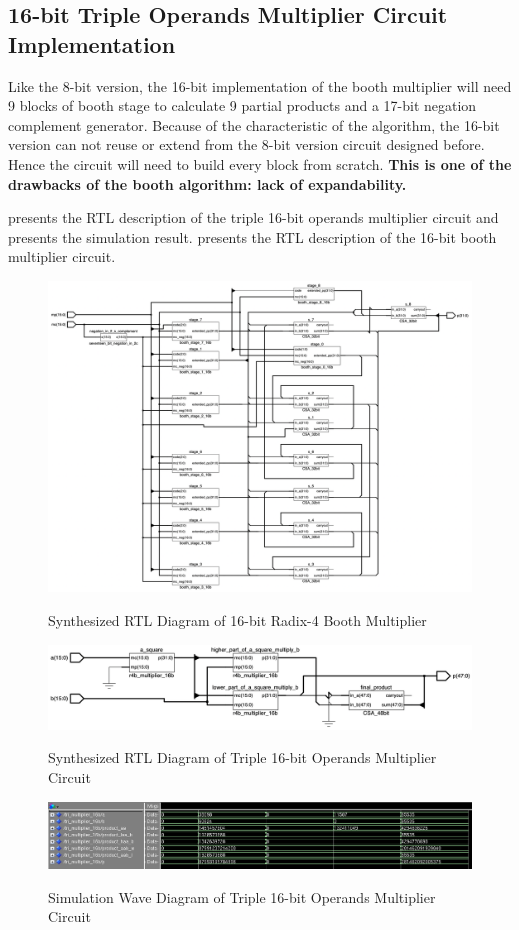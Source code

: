 \newpage
\subsection{16-bit Triple Operands Multiplier Circuit Implementation}

Like the 8-bit version, the 16-bit implementation of the booth multiplier will need 9 blocks of booth stage to calculate 9 partial products
and a 17-bit negation complement generator.
Because of the characteristic of the algorithm, the 16-bit version can not reuse or extend from the 8-bit version circuit designed before.
Hence the circuit will need to build every block from scratch.
\textbf{This is one of the drawbacks of the booth algorithm: lack of expandability.}

 presents the RTL description of the triple 16-bit operands multiplier circuit
and  presents the simulation result.  presents the RTL description of the 16-bit booth multiplier circuit.

\begin{figure}[!ht]
	\centering
	\caption{Synthesized RTL Diagram of 16-bit Radix-4 Booth Multiplier}
	\includegraphics[width=\textwidth]{../img/overview_booth_16b_rtl.png}
	\label{fig:overview_booth_16b_rtl}
\end{figure}

\begin{figure}[!ht]
	\centering
	\caption{Synthesized RTL Diagram of Triple 16-bit Operands Multiplier Circuit}
	\includegraphics[width=\textwidth]{../img/tri_16b_rtl.png}
	\label{fig:tri_16b_rtl}
\end{figure}

\begin{figure}[!ht]
	\centering
	\caption{Simulation Wave Diagram of Triple 16-bit Operands Multiplier Circuit}
	\includegraphics[width=\textwidth]{../img/tri_16b_sim.png}
	\label{fig:tri_16b_sim}
\end{figure}

\clearpage
